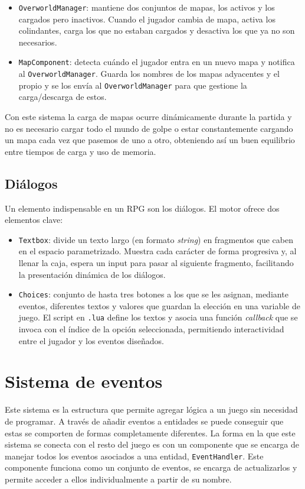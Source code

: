 \begin{itemize}
	\item \texttt{OverworldManager}: mantiene dos conjuntos de mapas, los activos y los cargados pero inactivos. Cuando el jugador cambia de mapa, activa los colindantes, carga los que no estaban cargados y desactiva los que ya no son necesarios.
	\item \texttt{MapComponent}: detecta cuándo el jugador entra en un nuevo mapa y notifica al \texttt{OverworldManager}. Guarda los nombres de los mapas adyacentes y el propio y se los envía al \texttt{OverworldManager} para que gestione la carga/descarga de estos.
\end{itemize}

Con este sistema la carga de mapas ocurre dinámicamente durante la partida y no es necesario cargar todo el mundo de golpe o estar constantemente cargando un mapa cada vez que pasemos de uno a otro, obteniendo así un buen equilibrio entre tiempos de carga y uso de memoria. 

\subsection{Diálogos}
Un elemento indispensable en un RPG son los diálogos. El motor ofrece dos elementos clave: 

\begin{itemize}
	\item \texttt{Textbox}: divide un texto largo (en formato \textit{string}) en fragmentos que caben en el espacio parametrizado. Muestra cada carácter de forma progresiva y, al llenar la caja, espera un input para pasar al siguiente fragmento, facilitando la presentación dinámica de los diálogos. 
	\item \texttt{Choices}: conjunto de hasta tres botones a los que se les asignan, mediante eventos, diferentes textos y valores que guardan la elección en una variable de juego. El script en \texttt{.lua} define los textos y asocia una función \textit{callback} que se invoca con el índice de la opción seleccionada, permitiendo interactividad entre el jugador y los eventos diseñados. 
\end{itemize}

\section{Sistema de eventos}
Este sistema es la estructura que permite agregar lógica a un juego sin necesidad de programar. A través de añadir eventos a entidades se puede conseguir que estas se comporten de formas completamente diferentes. La forma en la que este sistema se conecta con el resto del juego es con un componente que se encarga de manejar todos los eventos asociados a una entidad, \texttt{EventHandler}. Este componente funciona como un conjunto de eventos, se encarga de actualizarlos y permite acceder a ellos individualmente a partir de su nombre. 

